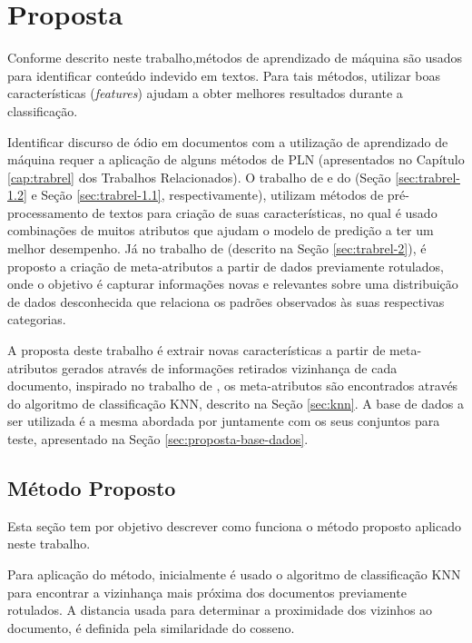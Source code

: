 \chapter{Proposta}\label{cap:proposta}

Conforme descrito neste trabalho,métodos de aprendizado de máquina são usados  para identificar conteúdo indevido em textos. Para tais métodos, utilizar boas características (\textit{features}) ajudam a obter melhores resultados durante a classificação.

Identificar discurso de ódio em documentos com a utilização de aprendizado de máquina requer a aplicação de alguns métodos de PLN (apresentados no Capítulo \ref{cap:trabrel} dos Trabalhos Relacionados). O trabalho de \cite{davidson2017automated} e do \cite{nobata2016abusive} (Seção \ref{sec:trabrel-1.2} e  Seção \ref{sec:trabrel-1.1}, respectivamente), utilizam métodos de pré-processamento de textos para criação de suas características, no qual é usado combinações de muitos atributos que ajudam o modelo de predição a ter um melhor desempenho. Já no trabalho de \cite{canutoestudo} (descrito na Seção \ref{sec:trabrel-2}), é proposto a criação de meta-atributos a partir de dados previamente rotulados, onde o objetivo é capturar informações novas e relevantes sobre uma distribuição de dados desconhecida
que relaciona os padrões observados às suas respectivas categorias. 

A proposta deste trabalho é extrair novas características a partir de meta-atributos gerados através de informações retirados vizinhança de cada documento, inspirado no trabalho de \cite{canutoestudo}, os meta-atributos são encontrados através do algoritmo de classificação KNN, descrito na Seção \ref{sec:knn}. A base de dados a ser utilizada é a mesma abordada por \cite{Pelle2017} juntamente com os seus conjuntos para teste, apresentado na Seção \ref{sec:proposta-base-dados}.

\section{Método Proposto}
Esta seção tem por objetivo descrever como funciona o método proposto aplicado neste trabalho. 

Para aplicação do método, inicialmente é usado o algoritmo de classificação KNN para encontrar a vizinhança mais próxima dos documentos previamente rotulados. A distancia usada para determinar a proximidade dos vizinhos ao documento, é definida pela similaridade do cosseno. 

